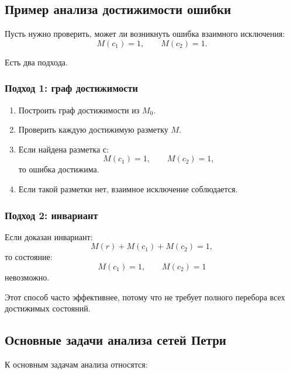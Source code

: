 \documentclass[12pt,a4paper]{article}
\begin{document}
\subsection{Пример анализа достижимости ошибки}

Пусть нужно проверить, может ли возникнуть ошибка взаимного исключения:
\[
M(c_1)=1,
\qquad
M(c_2)=1.
\]

Есть два подхода.

\subsubsection{Подход 1: граф достижимости}

\begin{enumerate}
    \item Построить граф достижимости из $M_0$.
    \item Проверить каждую достижимую разметку $M$.
    \item Если найдена разметка с:
    \[
    M(c_1)=1,
    \qquad
    M(c_2)=1,
    \]
    то ошибка достижима.
    \item Если такой разметки нет, взаимное исключение соблюдается.
\end{enumerate}

\subsubsection{Подход 2: инвариант}

Если доказан инвариант:
\[
M(r)+M(c_1)+M(c_2)=1,
\]
то состояние:
\[
M(c_1)=1,
\qquad
M(c_2)=1
\]
невозможно.

Этот способ часто эффективнее, потому что не требует полного перебора всех достижимых состояний.

\subsection{Основные задачи анализа сетей Петри}

К основным задачам анализа относятся:
\end{document}
